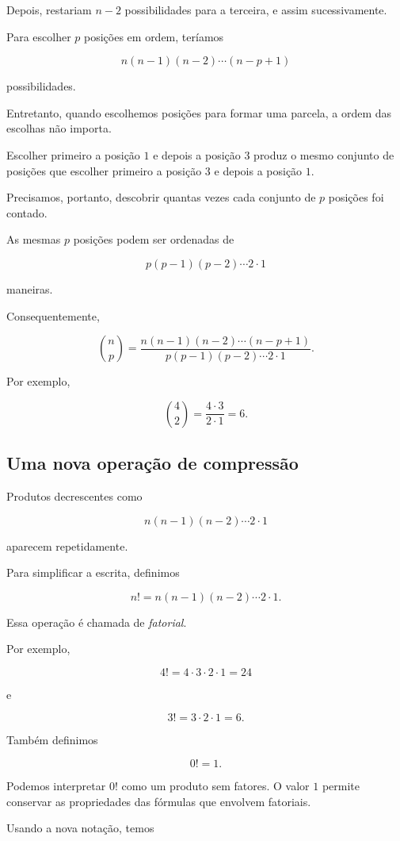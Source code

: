 \documentclass[12pt,a4paper]{article}
\begin{document}
Depois, restariam \(n-2\) possibilidades para a terceira, e assim
sucessivamente.

Para escolher \(p\) posições em ordem, teríamos

\[
n(n-1)(n-2)\cdots(n-p+1)
\]

possibilidades.

Entretanto, quando escolhemos posições para formar uma parcela, a ordem
das escolhas não importa.

Escolher primeiro a posição \(1\) e depois a posição \(3\) produz o
mesmo conjunto de posições que escolher primeiro a posição \(3\) e
depois a posição \(1\).

Precisamos, portanto, descobrir quantas vezes cada conjunto de \(p\)
posições foi contado.

As mesmas \(p\) posições podem ser ordenadas de

\[
p(p-1)(p-2)\cdots2\cdot1
\]

maneiras.

Consequentemente,

\[
\binom{n}{p}
=
\frac{
n(n-1)(n-2)\cdots(n-p+1)
}{
p(p-1)(p-2)\cdots2\cdot1
}.
\]

Por exemplo,

\[
\binom{4}{2}
=
\frac{4\cdot3}{2\cdot1}
=
6.
\]

\subsection{Uma nova operação de compressão}

Produtos decrescentes como

\[
n(n-1)(n-2)\cdots2\cdot1
\]

aparecem repetidamente.

Para simplificar a escrita, definimos

\[
n!
=
n(n-1)(n-2)\cdots2\cdot1.
\]

Essa operação é chamada de \emph{fatorial}.

Por exemplo,

\[
4!=4\cdot3\cdot2\cdot1=24
\]

e

\[
3!=3\cdot2\cdot1=6.
\]

Também definimos

\[
0!=1.
\]

Podemos interpretar \(0!\) como um produto sem fatores. O valor \(1\)
permite conservar as propriedades das fórmulas que envolvem fatoriais.

Usando a nova notação, temos
\end{document}
